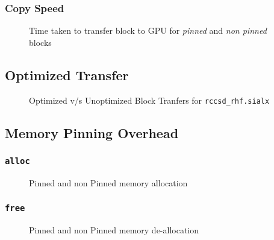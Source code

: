 \subsubsection{Copy Speed}
\begin{figure}[h]
  
  \caption{Time taken to transfer block to GPU for \textit{pinned} and \textit{non pinned} blocks}
\end{figure}
\subsection{Optimized Transfer}
\begin{figure}[h]
  
  \caption{Optimized v/s Unoptimized Block Tranfers for \texttt{rccsd\_rhf.sialx}}
\end{figure}

\subsection{Memory Pinning Overhead}
\subsubsection{\texttt{alloc}}
\begin{figure}[h]
  
  \caption{Pinned and non Pinned memory allocation}
\end{figure}

\subsubsection{\texttt{free}}
\begin{figure}[h]
  
  \caption{Pinned and non Pinned memory de-allocation}
\end{figure}